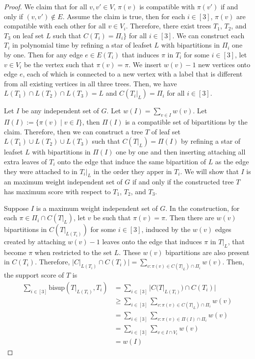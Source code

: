 \documentclass{bmcart}
\newcommand{\bs}{\mathrm{bisup}}
\begin{document}
\begin{proof}
  We claim that for all $v,v' \in V$, $\pi(v)$ is compatible with $\pi(v')$ if and only if $(v,v') \notin E$. Assume the claim is true, then for each $i \in [3]$, $\pi(v)$ are compatible with each other for all $v \in V_i$. Therefore, there exist trees $T_1$, $T_2$, and $T_3$ on leaf set $L$ such that $C(T_i) = \Pi_i\}$ for all $i \in [3]$. We can construct each $T_i$ in polynomial time by refining a star of leafset $L$ with bipartitions in $\Pi_i$ one by one. Then for any edge $e \in E(T_i)$ that induces $\pi$ in $T_i$ for some $i \in [3]$, let $v \in V_i$ be the vertex such that $\pi(v) = \pi$. We insert $w(v)-1$ new vertices onto edge $e$, each of which is connected to a new vertex with a label that is different from all existing vertices in all three trees. Then, we have $L(T_1) \cap L(T_2) \cap L(T_3) = L$ and $C(T_i|_L) = \Pi_i$ for all $i \in [3]$. \smallskip

  Let $I$ be any independent set of $G$. Let $w(I) = \sum_{v \in I} w(v)$. Let $\Pi(I) := \{\pi(v) \mid v \in I\}$, then $\Pi(I)$ is a compatible set of bipartitions by the claim. Therefore, then we can construct a tree $T$ of leaf set $L(T_1) \cup L(T_2) \cup L(T_3)$ such that $C(T|_L) = \Pi(I)$ by refining a star of leafset $L$ with bipartitions in $\Pi(I)$ one by one and then inserting attaching all extra leaves of $T_i$ onto the edge that induce the same bipartition of $L$ as the edge they were attached to in $T_i|_L$ in the order they apper in $T_i$. We will show that $I$ is an maximum weight independent set of $G$ if and only if the constructed tree $T$ has maximum score with respect to $T_1$, $T_2$, and $T_3$.\smallskip

  Suppose $I$ is a maximum weight independent set of $G$. In the construction, for each $\pi \in \Pi_i \cap C(T|_L)$, let $v$ be such that $\pi(v) = \pi$. Then there are $w(v)$ bipartitions in $C(T|_{L(T_i)})$ for some $i \in [3]$, induced by the $w(v)$ edges created by attaching $w(v)-1$ leaves onto the edge that induces $\pi$ in $T|_L$, that become $\pi$ when restricted to the set $L$. These $w(v)$ bipartitions are also present in $C(T_i)$. Therefore, $|C|_{L(T_i)} \cap C(T_i)| = \sum_{v: \pi(v) \in C(T|_L)\cap \Pi_i} w(v)$. Then, the support score of $T$ is
  \begin{align*}
    \sum_{i \in [3]}\bs(T|_{L(T_i)}, T_i) &= \sum_{i \in [3]}|C(T|_{L(T_i)}) \cap C(T_i)| \\
    &\ge \sum_{i \in [3]} \sum_{v: \pi(v) \in C(T|_L)\cap \Pi_i} w(v) \\
    &= \sum_{i \in [3]} \sum_{v: \pi(v) \in \Pi(I) \cap \Pi_i} w(v) \\
    &= \sum_{i \in [3]} \sum_{v \in I \cap V_i} w(v) \\
    &= w(I)
  \end{align*}
  


\end{proof}
\end{document}
